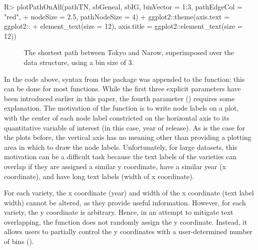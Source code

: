\documentclass[article,shortnames]{jss}
\begin{document}
\begin{Code}
R> plotPathOnAll(pathTN, sbGeneal, sbIG, binVector = 1:3, pathEdgeCol = "red",
+    nodeSize = 2.5, pathNodeSize = 4) + ggplot2::theme(axis.text = ggplot2::
+    element_text(size = 12), axis.title = ggplot2::element_text(size = 12))
\end{Code}

\begin{figure}%
    \centering
    \caption{The shortest path between Tokyo and Narow, superimposed over the data structure, using a bin size of 3.}
    \label{fig:plotTNBin3}
\end{figure}

In the code above, syntax from the  package was appended to the  function; this can be done for most  functions. While the first three explicit parameters have been introduced earlier in this paper, the fourth parameter () requires some explanation. The motivation of the  function is to write node labels on a plot, with the center of each node label constricted on the horizontal axis to its quantitative variable of interest (in this case, year of release). As is the case for the plots before, the vertical axis has no meaning other than providing a plotting area in which to draw the node labels. Unfortunately, for large datasets, this motivation can be a difficult task because the text labels of the varieties can overlap if they are assigned a similar y coordinate, have a similar year (x coordinate), and have long text labels (width of x coordinate).

For each variety, the x coordinate (year) and width of the x coordinate (text label width) cannot be altered, as they provide useful information. However, for each variety, the y coordinate is arbitrary. Hence, in an attempt to mitigate text overlapping, the  function does not randomly assign the y coordinate. Instead, it allows users to partially control the y coordinates with a user-determined number of bins ().
\end{document}
